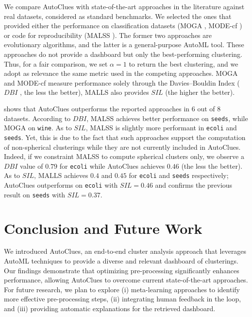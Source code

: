 \documentclass[runningheads]{llncs}
\begin{document}
We compare AutoClues with state-of-the-art approaches in the literature against real datasets, considered as standard benchmarks.
We selected the ones that provided either the performance on classification datasets (MOGA \cite{dutta2013}, MODE-cf \cite{hancer2020new}) or code for reproducibility (MALSS \cite{Kamoshida2020}).
The former two approaches are evolutionary algorithms, and the latter is a general-purpose AutoML tool.
These approaches do not provide a dashboard but only the best-performing clustering.
Thus, for a fair comparison, we set $\alpha=1$ to return the best clustering, and we adopt as relevance the same metric used in the competing approaches.
MOGA and MODE-cf measure performance solely through the Davies–Bouldin Index ($DBI$ \cite{dbi}, the less the better),
MALLS also provides $SIL$ (the higher the better).

 shows that AutoClues outperforms the reported approaches in 6 out of 8 datasets.
According to $DBI$, MALSS achieves better performance on \texttt{seeds}, while MOGA on \texttt{wine}.
As to $SIL$, MALSS is slightly more performant in \texttt{ecoli} and \texttt{seeds}.
Yet, this is due to the fact that such approaches support the computation of non-spherical clusterings while they are not currently included in AutoClues. 
Indeed, if we constraint MALSS to compute spherical clusters only, we observe a $DBI$ value of $0.79$ for \texttt{ecoli} while AutoClues achieves $0.46$ (the less the better).
As to $SIL$, MALLS achieves $0.4$ and $0.45$ for \texttt{ecoli} and \texttt{seeds} respectively; AutoClues outperforms on \texttt{ecoli} with $SIL=0.46$ and confirms the previous result on \texttt{seeds} with $SIL=0.37$.

\section{Conclusion and Future Work}\label{sec:conclusion}
We introduced AutoClues, an end-to-end cluster analysis approach that leverages AutoML techniques to provide a diverse and relevant dashboard of clusterings. Our findings demonstrate that optimizing pre-processing significantly enhances performance, allowing AutoClues to overcome current state-of-the-art approaches. For future research, we plan to explore (i) meta-learning approaches to identify more effective pre-processing steps, (ii) integrating human feedback in the loop, and (iii) providing automatic explanations for the retrieved dashboard.



\end{document}
